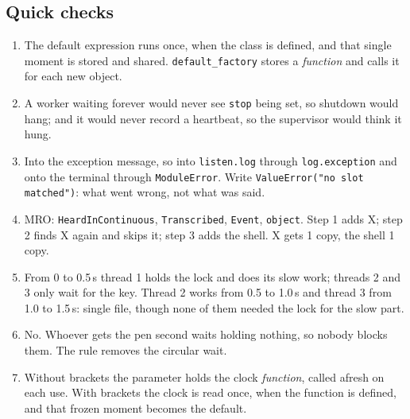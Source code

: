 \documentclass[11pt,a4paper]{article}
\begin{document}
\subsection*{Quick checks}
\begin{enumerate}[label=\textbf{\arabic*.}]
  \item The default expression runs once, when the class is defined, and that single moment is
        stored and shared. \texttt{default\_factory} stores a \emph{function} and calls it for
        each new object.
  \item A worker waiting forever would never see \texttt{stop} being set, so shutdown would hang;
        and it would never record a heartbeat, so the supervisor would think it hung.
  \item Into the exception message, so into \texttt{listen.log} through \texttt{log.exception}
        and onto the terminal through \texttt{ModuleError}. Write
        \texttt{ValueError("no slot matched")}: what went wrong, not what was said.
  \item MRO: \texttt{HeardInContinuous}, \texttt{Transcribed}, \texttt{Event}, \texttt{object}.
        Step 1 adds X; step 2 finds X again and skips it; step 3 adds the shell. X gets 1 copy,
        the shell 1 copy.
  \item From 0 to 0.5\,s thread 1 holds the lock and does its slow work; threads 2 and 3 only
        wait for the key. Thread 2 works from 0.5 to 1.0\,s and thread 3 from 1.0 to 1.5\,s:
        single file, though none of them needed the lock for the slow part.
  \item No. Whoever gets the pen second waits holding nothing, so nobody blocks them. The rule
        removes the circular wait.
  \item Without brackets the parameter holds the clock \emph{function}, called afresh on each
        use. With brackets the clock is read once, when the function is defined, and that frozen
        moment becomes the default.
\end{enumerate}
\end{document}
